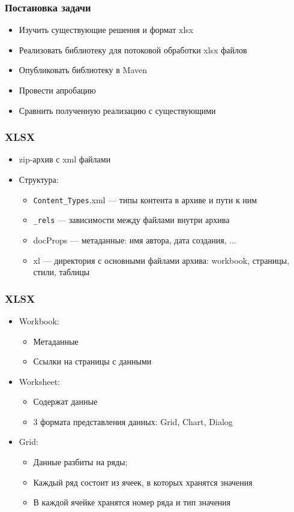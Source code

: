 \documentclass{beamer}
\begin{document}
\begin{frame}\frametitle{Постановка задачи}
\begin{itemize}
    \item Изучить существующие решения и формат xlsx
    \item Реализовать библиотеку для потоковой обработки xlsx файлов
    \item Опубликовать библиотеку в Maven
    \item Провести апробацию
    \item Сравнить полученную реализацию с существующими
\end{itemize}
\end{frame}

\begin{frame}\frametitle{XLSX}
\begin{itemize}
    \item zip-архив с xml файлами
    \item Структура:
    \begin{itemize}
        \item \texttt{Content\_Types}.xml --- типы контента в архиве и пути к ним
        \item \texttt{\_rels} --- зависимости между файлами внутри архива
        \item docProps --- метаданные: имя автора, дата создания, ...
        \item xl --- директория с основными файлами архива: workbook, страницы, стили, таблицы
    \end{itemize}
\end{itemize}
\end{frame}

\begin{frame}\frametitle{XLSX}
\begin{itemize}
    \item Workbook:
    \begin{itemize}
        \item Метаданные
        \item Ссылки на страницы с данными
    \end{itemize}
    \item Worksheet:
    \begin{itemize}
        \item Содержат данные
        \item 3 формата представления данных: Grid, Chart, Dialog 
    \end{itemize}
    \item Grid:
    \begin{itemize}
        \item Данные разбиты на ряды;
        \item Каждый ряд состоит из ячеек, в которых хранятся значения
        \item В каждой ячейке хранятся номер ряда и тип значения
    \end{itemize}
\end{itemize}
\end{frame}
\end{document}
